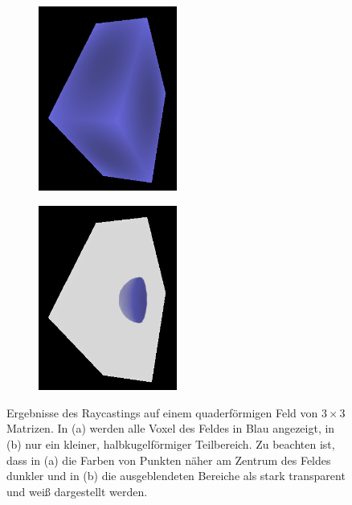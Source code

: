\documentclass[a4paper,fontsize=12pt,toc=bib,parskip=half,ngerman]{scrartcl}
\begin{document}
\begin{figure}
	\hspace*{\fill}
	\begin{subfigure}{0.49\textwidth}
		\centering
		\includegraphics[width=0.5\textwidth]{pictures/Raycasting1.png}
		\subcaption{}
		\label{RaycastingExample1}
	\end{subfigure}
	\hfill
	\begin{subfigure}{0.49\textwidth}
		\centering
		\includegraphics[width=0.5\textwidth]{pictures/Raycasting2.png}
		\subcaption{}
		\label{RaycastingExample2}
	\end{subfigure}
	\hspace*{\fill}
	\caption{Ergebnisse des Raycastings auf einem quaderf\"ormigen Feld von $3\times3$ Matrizen. In (a) werden alle Voxel des Feldes in Blau angezeigt, in (b) nur ein kleiner, halbkugelf\"ormiger Teilbereich. Zu beachten ist, dass in (a) die Farben von Punkten n\"aher am Zentrum des Feldes dunkler und in (b) die ausgeblendeten Bereiche als stark transparent und wei{\ss} dargestellt werden.}
	\label{RaycastingExample}
\end{figure}
\end{document}
